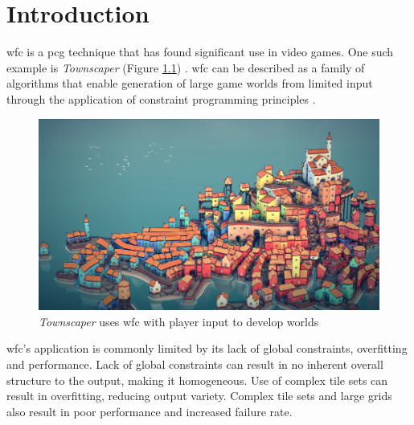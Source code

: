\chapter{Introduction} %
\acrfull{wfc} \cite{Gumin_Wave_Function_Collapse_2016} is a \acrfull{pcg} technique that has found significant use in video games. One such example is \textit{Townscaper} (Figure \ref{fig:townscaper}) \cite{townscaper}. \acrshort{wfc} can be described as a family of algorithms that enable generation of large game worlds from limited input through the application of constraint programming principles \cite{WFC_ConstraintSolving_and_ML}.

\begin{figure}[H]
    \centering
    \includegraphics[width=\textwidth, height=0.3\textheight, keepaspectratio]{Images/Townscaper.png}
    \caption{\textit{Townscaper} uses \acrshort{wfc} with player input to develop worlds \cite{townscaper}}
    \label{fig:townscaper}
\end{figure}

\acrshort{wfc}'s application is commonly limited by its lack of global constraints, overfitting and performance. Lack of global constraints can result in no inherent overall structure to the output, making it homogeneous. Use of complex tile sets can result in overfitting, reducing output variety. Complex tile sets and large grids also result in poor performance and increased failure rate.

